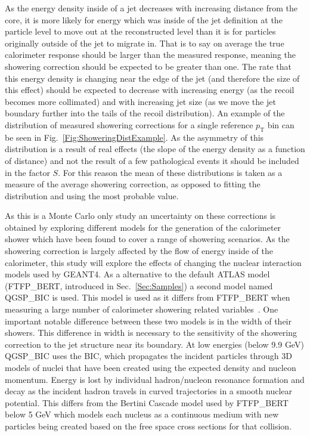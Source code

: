 As the energy density inside of a jet decreases with increasing distance from the core, it is more likely for energy which was inside of the jet definition at the particle level to move out at the reconstructed level than it is for particles originally outside of the jet to migrate in.  
That is to say on average the true calorimeter response should be larger than the measured response, meaning the showering correction should be expected to be greater than one.  
The rate that this energy density is changing near the edge of the jet (and therefore the size of this effect) should be expected to decrease with increasing energy (as the recoil becomes more collimated) and with increasing jet size (as we move the jet boundary further into the tails of the recoil distribution).  
An example of the distribution of measured showering corrections for a single reference $p_{\mathrm T}$ bin can be seen in Fig.~\ref{Fig:ShoweringDistExample}.  
As the asymmetry of this distribution is a result of real effects (the slope of the energy density as a function of distance) and not the result of a few pathological events it should be included in the factor $S$.  
For this reason the mean of these distributions is taken as a measure of the average showering correction, as opposed to fitting the distribution and using the most probable value.  

As this is a Monte Carlo only study an uncertainty on these corrections is obtained by exploring different models for the generation of the calorimeter shower which have been found to cover a range of showering scenarios.  
As the showering correction is largely affected by the flow of energy inside of the calorimeter, this study will explore the effects of changing the nuclear interaction models used by GEANT4.  
As a alternative to the default ATLAS model (FTFP\_BERT, introduced in Sec.~\ref{Sec:Samples}) a second model named QGSP\_BIC is used.  
This model is used as it differs from FTFP\_BERT when measuring a large number of calorimeter showering related variables~\cite{Zhang:2253040}.  
One important notable difference between these two models is in the width of their showers.  
This difference in width is necessary to the sensitivity of the showering correction to the jet structure near its boundary.  
At low energies (below 9.9 GeV) QGSP\_BIC uses the \gls{BIC}, which propagates the incident particles through 3D models of nuclei that have been created using the expected density and nucleon momentum.  
Energy is lost by individual hadron/nucleon resonance formation and decay as the incident hadron travels in curved trajectories in a smooth nuclear potential.  
This differs from the Bertini Cascade model used by FTFP\_BERT below 5 GeV which models each nucleus as a continuous medium with new particles being created based on the free space cross sections for that collision.  

